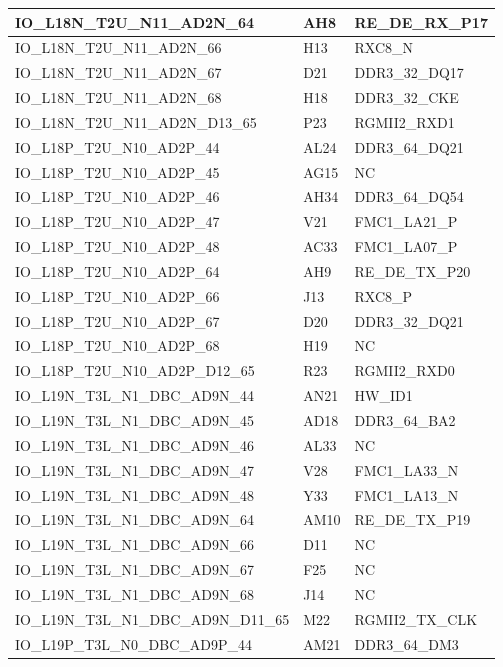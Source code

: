 \begin{footnotesize}
\begin{longtable}{|p{7cm}|p{1cm}|p{5cm}|}
IO\_L18N\_T2U\_N11\_AD2N\_64	&	AH8	&	RE\_DE\_RX\_P17	\\ \hline
IO\_L18N\_T2U\_N11\_AD2N\_66	&	H13	&	RXC8\_N	\\ \hline
IO\_L18N\_T2U\_N11\_AD2N\_67	&	D21	&	DDR3\_32\_DQ17	\\ \hline
IO\_L18N\_T2U\_N11\_AD2N\_68	&	H18	&	DDR3\_32\_CKE	\\ \hline
IO\_L18N\_T2U\_N11\_AD2N\_D13\_65	&	P23	&	RGMII2\_RXD1	\\ \hline
IO\_L18P\_T2U\_N10\_AD2P\_44	&	AL24	&	DDR3\_64\_DQ21	\\ \hline
IO\_L18P\_T2U\_N10\_AD2P\_45	&	AG15	&	NC	\\ \hline
IO\_L18P\_T2U\_N10\_AD2P\_46	&	AH34	&	DDR3\_64\_DQ54	\\ \hline
IO\_L18P\_T2U\_N10\_AD2P\_47	&	V21	&	FMC1\_LA21\_P	\\ \hline
IO\_L18P\_T2U\_N10\_AD2P\_48	&	AC33	&	FMC1\_LA07\_P	\\ \hline
IO\_L18P\_T2U\_N10\_AD2P\_64	&	AH9	&	RE\_DE\_TX\_P20	\\ \hline
IO\_L18P\_T2U\_N10\_AD2P\_66	&	J13	&	RXC8\_P	\\ \hline
IO\_L18P\_T2U\_N10\_AD2P\_67	&	D20	&	DDR3\_32\_DQ21	\\ \hline
IO\_L18P\_T2U\_N10\_AD2P\_68	&	H19	&	NC	\\ \hline
IO\_L18P\_T2U\_N10\_AD2P\_D12\_65	&	R23	&	RGMII2\_RXD0	\\ \hline
IO\_L19N\_T3L\_N1\_DBC\_AD9N\_44	&	AN21	&	HW\_ID1	\\ \hline
IO\_L19N\_T3L\_N1\_DBC\_AD9N\_45	&	AD18	&	DDR3\_64\_BA2	\\ \hline
IO\_L19N\_T3L\_N1\_DBC\_AD9N\_46	&	AL33	&	NC	\\ \hline
IO\_L19N\_T3L\_N1\_DBC\_AD9N\_47	&	V28	&	FMC1\_LA33\_N	\\ \hline
IO\_L19N\_T3L\_N1\_DBC\_AD9N\_48	&	Y33	&	FMC1\_LA13\_N	\\ \hline
IO\_L19N\_T3L\_N1\_DBC\_AD9N\_64	&	AM10	&	RE\_DE\_TX\_P19	\\ \hline
IO\_L19N\_T3L\_N1\_DBC\_AD9N\_66	&	D11	&	NC	\\ \hline
IO\_L19N\_T3L\_N1\_DBC\_AD9N\_67	&	F25	&	NC	\\ \hline
IO\_L19N\_T3L\_N1\_DBC\_AD9N\_68	&	J14	&	NC	\\ \hline
IO\_L19N\_T3L\_N1\_DBC\_AD9N\_D11\_65	&	M22	&	RGMII2\_TX\_CLK	\\ \hline
IO\_L19P\_T3L\_N0\_DBC\_AD9P\_44	&	AM21	&	DDR3\_64\_DM3	\\ \hline

\end{longtable}
\end{footnotesize}
